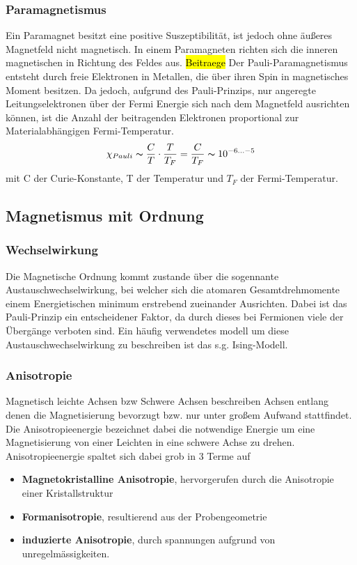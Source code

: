         \subsubsection*{Paramagnetismus}
            Ein Paramagnet besitzt eine positive Suszeptibilität, ist jedoch ohne äußeres 
            Magnetfeld nicht magnetisch. In einem Paramagneten richten sich die inneren magnetischen 
            in Richtung des Feldes aus.
            \hl{Beitraege}
            Der Pauli-Paramagnetismus entsteht durch freie Elektronen in Metallen, die über ihren Spin 
            in magnetisches Moment besitzen. Da jedoch, aufgrund des Pauli-Prinzips, nur angeregte
            Leitungselektronen über der Fermi Energie sich nach dem Magnetfeld ausrichten können, 
            ist die Anzahl der beitragenden Elektronen proportional zur Materialabhängigen Fermi-Temperatur.
            \begin{equation}
                \chi_{Pauli} \thicksim \frac{C}{T} \cdot \frac{T}{T_{F}} = \frac{C}{T_F}\thicksim 10^{-6 ... -5}
            \end{equation}
            mit C der Curie-Konstante, T der Temperatur und $T_F$ der Fermi-Temperatur.
    

    \subsection{Magnetismus mit Ordnung}
        \subsubsection*{Wechselwirkung}
            Die Magnetische Ordnung kommt zustande über die sogennante Austauschwechselwirkung, bei welcher sich
            die atomaren Gesamtdrehmomente einem Energietischen minimum erstrebend zueinander Ausrichten. Dabei ist 
            das Pauli-Prinzip ein entscheidener Faktor, da durch dieses bei Fermionen viele der Übergänge verboten sind.
            Ein häufig verwendetes modell um diese Austauschwechselwirkung zu beschreiben ist das s.g. Ising-Modell.
        \subsubsection*{Anisotropie}
            Magnetisch leichte Achsen bzw Schwere Achsen beschreiben Achsen entlang denen die Magnetisierung bevorzugt
            bzw. nur unter großem Aufwand stattfindet. Die Anisotropieenergie bezeichnet dabei die notwendige Energie
            um eine Magnetisierung von einer Leichten in eine schwere Achse zu drehen.\\
            Anisotropieenergie spaltet sich dabei grob in 3 Terme auf
            \begin{itemize}
                \item \textbf{Magnetokristalline Anisotropie}, hervorgerufen durch die Anisotropie einer Kristallstruktur
                \item \textbf{Formanisotropie}, resultierend aus der Probengeometrie
                \item \textbf{induzierte Anisotropie}, durch spannungen aufgrund von unregelmässigkeiten. 
            \end{itemize}
